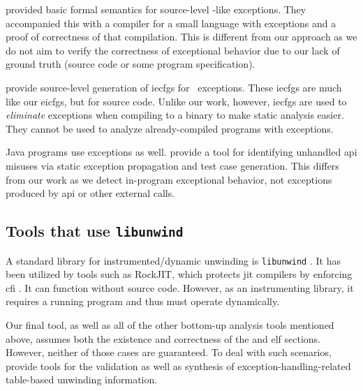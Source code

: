 \Textcite{hutton2004compiling} provided basic formal semantics for source-level \Cpp-like exceptions.
They accompanied this with a compiler for a small language with exceptions and a proof of correctness of that compilation.
This is different from our approach as we do not aim to verify the correctness of exceptional behavior due to our lack of ground truth (source code or some program specification).

\Textcite{prabhu2011interprocedural} provide source-level generation of \acp{iecfg} for \Cpp\ exceptions.
These \acp{iecfg} are much like our \acp{eicfg}, but for source code.
Unlike our work, however, \acp{iecfg} are used to \emph{eliminate} exceptions when compiling to a binary to make static analysis easier.
They cannot be used to analyze already-compiled programs with exceptions.

Java programs use exceptions as well. \Textcite{kechagia2019misuse} provide a tool for identifying unhandled \ac{api} misuses via static exception propagation and test case generation. This differs from our work as we detect in-program exceptional behavior, not exceptions produced by \ac{api} or other external calls.

\subsection{Tools that use \texttt{libunwind}}
A standard library for instrumented/dynamic unwinding is \lstinline|libunwind| \autocite{libunwind}.
It has been utilized by tools such as RockJIT, which protects \ac{jit} compilers by enforcing \ac{cfi} \autocite{niu2014rockjit}.
It can function without source code. However, as an instrumenting library, it requires a running program and thus must operate dynamically.

Our final tool, as well as all of the other bottom-up analysis tools mentioned above, assumes both the existence and correctness of the  and  \ac{elf} sections.
However, neither of those cases are guaranteed.
To deal with such scenarios, \textcite{bastian2019dwarf} provide tools for the validation as well as synthesis of exception-handling-related table-based unwinding information.

%
%
%
%

